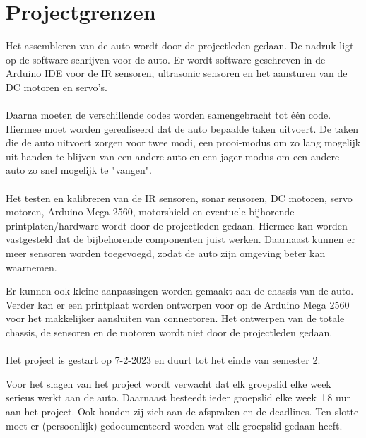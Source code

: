 \section{Projectgrenzen}
Het assembleren van de auto wordt door de projectleden gedaan. De nadruk ligt op de software schrijven voor de auto. Er wordt software geschreven in de Arduino IDE voor de IR sensoren, ultrasonic sensoren en het aansturen van de DC motoren en servo’s.
\\\\
Daarna moeten de verschillende codes worden samengebracht tot één code. Hiermee moet worden gerealiseerd dat de auto bepaalde taken uitvoert. De taken die de auto uitvoert zorgen voor twee modi, een prooi-modus om zo lang mogelijk uit handen te blijven van een andere auto en een jager-modus om een andere auto zo snel mogelijk te "vangen".
\\\\
Het testen en kalibreren van de IR sensoren, sonar sensoren, DC motoren, servo motoren, Arduino Mega 2560, motorshield en eventuele bijhorende printplaten/hardware wordt door de projectleden gedaan. Hiermee kan worden vastgesteld dat de bijbehorende componenten juist werken. Daarnaast kunnen er meer sensoren worden toegevoegd, zodat de auto zijn omgeving beter kan waarnemen. 

Er kunnen ook kleine aanpassingen worden gemaakt aan de chassis van de auto. Verder kan er een printplaat worden ontworpen voor op de Arduino Mega 2560 voor het makkelijker aansluiten van connectoren.
Het ontwerpen van de totale chassis, de sensoren en de motoren wordt niet door de projectleden gedaan.
\\\\
Het project is gestart op 7-2-2023 en duurt tot het einde van semester 2.

Voor het slagen van het project wordt verwacht dat elk groepslid elke week serieus werkt aan de auto. Daarnaast besteedt ieder groepslid elke week ±8 uur aan het project. Ook houden zij zich aan de afspraken en de deadlines. Ten slotte moet er (persoonlijk) gedocumenteerd worden wat elk groepslid gedaan heeft.
